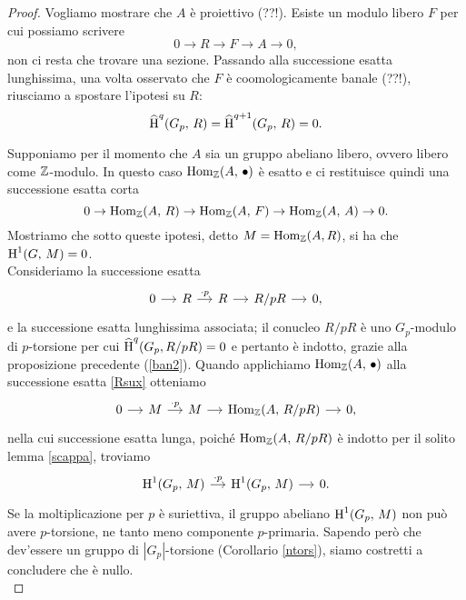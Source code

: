\begin{proof}
	Vogliamo mostrare che $ A $ è proiettivo (??!). Esiste un modulo libero $ F $ per cui possiamo scrivere
	\begin{equation}\label{projban3}
		0 \to R \to F \to A \to 0,
	\end{equation}
	non ci resta che trovare una sezione.
	Passando alla successione esatta lunghissima, una volta osservato che $ F $ è coomologicamente banale (??!), riusciamo a spostare l'ipotesi su $ R $:
	\[ \operatorname{\widehat{H}}^q(G_p, \, R) = \operatorname{\widehat{H}}^{q+1}(G_p, \, R) = 0. \]
	
	Supponiamo per il momento che $ A $ sia un gruppo abeliano libero, ovvero libero come $ \mathbb{Z} $-modulo. In questo caso $ \operatorname{Hom}_{\mathbb{Z}}(A, \, \bullet) $ è esatto e ci restituisce quindi una successione esatta corta
	\begin{equation}\label{homban3}
		0 \to \operatorname{Hom}_{\mathbb{Z}}(A, \, R) \to \operatorname{Hom}_{\mathbb{Z}}(A, \, F) \to \operatorname{Hom}_{\mathbb{Z}}(A, \, A) \to 0.
	\end{equation}
	Mostriamo che sotto queste ipotesi, detto $ M = \operatorname{Hom}_{\mathbb{Z}}(A, R) $, si ha che $ \operatorname{H}^1(G, \, M) = 0 $. \\
	
	Consideriamo la successione esatta
	\begin{equation}\label{Rsux}
		\begin{tikzcd}[column sep = small]
		0 \rar & R \rar["\cdot p"] & R \rar & R/pR \rar & 0,
		\end{tikzcd}
	\end{equation}
	e la successione esatta lunghissima associata; il conucleo $ R/pR $ è uno $ G_p $-modulo di $ p $-torsione per cui $ \operatorname{\widehat{H}}^{q}(G_p, R/pR) = 0 $ e pertanto è indotto, grazie alla proposizione precedente (\ref{ban2}). Quando applichiamo $ \operatorname{Hom}_{\mathbb{Z}}(A, \, \bullet) $ alla successione esatta \ref{Rsux} otteniamo
	\begin{equation*}
		\begin{tikzcd}[column sep = small]
		0 \rar & M \rar["\cdot p"] & M \rar & \Hom_\Z(A, \, R/pR) \rar & 0,
		\end{tikzcd}
	\end{equation*}
	nella cui successione esatta lunga, poiché $ \operatorname{Hom}_{\mathbb{Z}}(A, \, R/pR) $ è indotto per il solito lemma \ref{scappa}, troviamo
	\[ \begin{tikzcd}[column sep = small]
	\HH^1(G_p, \, M) \rar["\cdot p"] & \HH^1(G_p, \, M) \rar & 0.
	\end{tikzcd}  \]
	Se la moltiplicazione per $ p $ è suriettiva, il gruppo abeliano $ \operatorname{H}^1(G_p, \, M) $ non può avere $ p $-torsione, ne tanto meno componente $ p $-primaria. Sapendo però che dev'essere un gruppo di $ |G_p | $-torsione (Corollario \ref{ntors}), siamo costretti a concludere che è nullo. \\
	

\end{proof}
